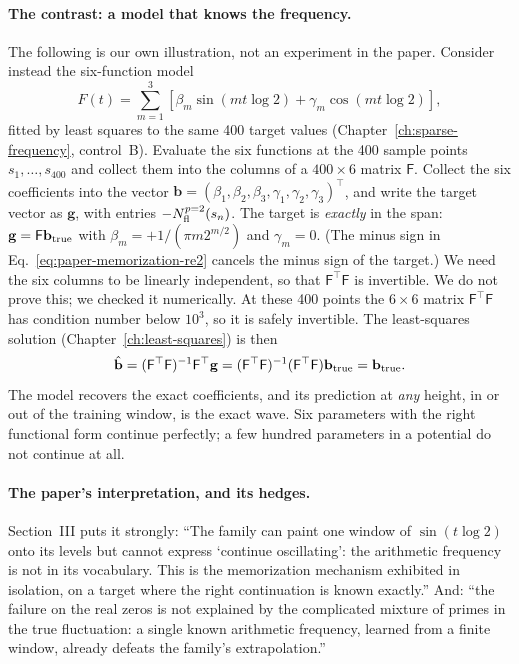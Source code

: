 \paragraph{The contrast: a model that knows the frequency.} The following is our own illustration, not an experiment in the paper. Consider instead the six-function model
\[
F(t)=\sum_{m=1}^{3}\left[\beta_m\sin(mt\log2)+\gamma_m\cos(mt\log2)\right],
\]
fitted by least squares to the same 400 target values (Chapter~\ref{ch:sparse-frequency}, control~B). Evaluate the six functions at the 400 sample points $s_1,\dots,s_{400}$ and collect them into the columns of a $400\times6$ matrix $\mathsf F$. Collect the six coefficients into the vector $\mathbf b=(\beta_1,\beta_2,\beta_3,\gamma_1,\gamma_2,\gamma_3)^\top$, and write the target vector as $\mathbf g$, with entries $-N^{p=2}_{\rm fl}(s_n)$. The target is \emph{exactly} in the span: $\mathbf g=\mathsf F\mathbf b_{\rm true}$ with $\beta_m=+1/(\pi m2^{m/2})$ and $\gamma_m=0$. (The minus sign in Eq.~\eqref{eq:paper-memorization-re2} cancels the minus sign of the target.) We need the six columns to be linearly independent, so that $\mathsf F^\top\mathsf F$ is invertible. We do not prove this; we checked it numerically. At these 400 points the $6\times6$ matrix $\mathsf F^\top\mathsf F$ has condition number below $10^3$, so it is safely invertible. The least-squares solution (Chapter~\ref{ch:least-squares}) is then
\[
\hat{\mathbf b}=(\mathsf F^\top\mathsf F)^{-1}\mathsf F^\top\mathbf g=(\mathsf F^\top\mathsf F)^{-1}(\mathsf F^\top\mathsf F)\mathbf b_{\rm true}=\mathbf b_{\rm true}.
\]
The model recovers the exact coefficients, and its prediction at \emph{any} height, in or out of the training window, is the exact wave. Six parameters with the right functional form continue perfectly; a few hundred parameters in a potential do not continue at all.

\paragraph{The paper's interpretation, and its hedges.} Section~III puts it strongly: ``The family can paint one window of $\sin(t\log 2)$ onto its levels but cannot express `continue oscillating': the arithmetic frequency is not in its vocabulary. This is the memorization mechanism exhibited in isolation, on a target where the right continuation is known exactly.'' And: ``the failure on the real zeros is not explained by the complicated mixture of primes in the true fluctuation: a single known arithmetic frequency, learned from a finite window, already defeats the family's extrapolation.''

